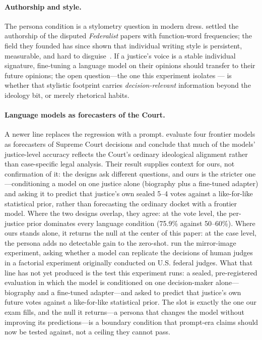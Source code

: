 \paragraph{Authorship and style.}
The persona condition is a stylometry question in modern dress.
\citet{mosteller1964} settled the authorship of the disputed
\emph{Federalist} papers with function-word frequencies; the field
they founded has since shown that individual writing style is
persistent, measurable, and hard to disguise~\citep{juola2006}. If a
justice's voice is a stable individual signature, fine-tuning a
language model on their opinions should transfer to their future
opinions; the open question---the one this experiment isolates ---
is whether that stylistic footprint carries \emph{decision-relevant}
information beyond the ideology bit, or merely rhetorical habits.

\paragraph{Language models as forecasters of the Court.}
A newer line replaces the regression with a prompt. \citet{stillwell2026}
evaluate four frontier models as forecasters of Supreme Court
decisions and conclude that much of the models' justice-level
accuracy reflects the Court's ordinary ideological alignment rather
than case-specific legal analysis. Their result supplies context for
ours, not confirmation of it: the designs ask different questions, and
ours is the stricter one---conditioning a model on one justice alone
(biography plus a fine-tuned adapter) and asking it to predict that
justice's own sealed 5--4 votes against a like-for-like statistical
prior, rather than forecasting the ordinary docket with a frontier
model. Where the two designs overlap, they agree: at the vote level,
the per-justice prior dominates every language condition (75.9\%
against 50--60\%). Where ours stands alone, it returns the null at the
center of this paper: at the case level, the persona adds no
detectable gain to the zero-shot. \citet{posner2025} run the mirror-image
experiment, asking whether a model can replicate the decisions of
human judges in a factorial experiment originally conducted on U.S.
federal judges. What that line has not yet produced is the test this
experiment runs: a sealed, pre-registered evaluation in which the
model is conditioned on one decision-maker alone---biography and a
fine-tuned adapter---and asked to predict that justice's own future
votes against a like-for-like statistical prior. The slot is exactly
the one our exam fills, and the null it returns---a persona that
changes the model without improving its predictions---is a boundary
condition that prompt-era claims should now be tested against, not a
ceiling they cannot pass.

